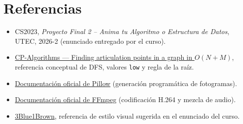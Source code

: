 \documentclass[11pt,a4paper]{article}
\begin{document}
\section*{Referencias}
\begin{itemize}
  \item CS2023, \emph{Proyecto Final 2 -- Anima tu Algoritmo o Estructura de
    Datos}, UTEC, 2026-2 (enunciado entregado por el curso).
  \item \href{https://cp-algorithms.com/graph/cutpoints.html}{CP-Algorithms ---
    Finding articulation points in a graph in $O(N+M)$}, referencia conceptual
    de DFS, valores \texttt{low} y regla de la raíz.
  \item \href{https://pillow.readthedocs.io/}{Documentación oficial de Pillow}
    (generación programática de fotogramas).
  \item \href{https://ffmpeg.org/documentation.html}{Documentación oficial de
    FFmpeg} (codificación H.264 y mezcla de audio).
  \item \href{https://www.3blue1brown.com/}{3Blue1Brown}, referencia de estilo
    visual sugerida en el enunciado del curso.
\end{itemize}
\end{document}
